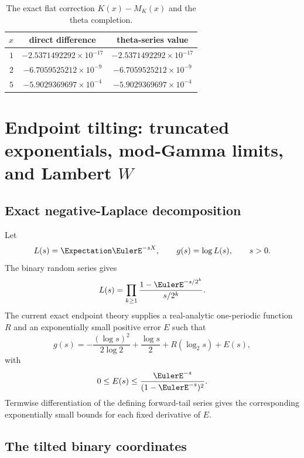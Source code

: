 \documentclass[11pt]{article}
\numberwithin{equation}{section}
\theoremstyle{definition}
\theoremstyle{remark}
\begin{document}
\begin{table}[ht]
\centering
\caption{The exact flat correction $K(x)-M_K(x)$ and the theta completion.}
\label{p5:tab:theta-check}
\begin{tabular}{@{}rcc@{}}
\toprule
$x$ & direct difference & theta-series value\\
\midrule
$1$ & $-2.5371492292\times10^{-17}$ & $-2.5371492292\times10^{-17}$\\
$2$ & $-6.7059525212\times10^{-9}$  & $-6.7059525212\times10^{-9}$\\
$5$ & $-5.9029369697\times10^{-4}$  & $-5.9029369697\times10^{-4}$\\
\bottomrule
\end{tabular}
\end{table}

\section{Endpoint tilting: truncated exponentials, mod-Gamma limits, and Lambert $W$}

\subsection{Exact negative-Laplace decomposition}

Let
\begin{equation}\label{p5:eq:L-g-def}
 L(s)=\Expectation\EulerE^{-sX},\qquad g(s)=\log L(s),\qquad s>0.
\end{equation}
The binary random series gives
\begin{equation}\label{p5:eq:L-product}
 L(s)=\prod_{k\ge1}\frac{1-\EulerE^{-s/2^k}}{s/2^k}.
\end{equation}
The current exact endpoint theory supplies a real-analytic one-periodic
function $R$ and an exponentially small positive error $E$ such that
\begin{equation}\label{p5:eq:g-decomp}
 \boxed{
 g(s)=-\frac{(\log s)^2}{2\log2}+\frac{\log s}{2}
 +R(\log_2s)+E(s),}
\end{equation}
with
\begin{equation}\label{p5:eq:E-bound}
 0\le E(s)\le\frac{\EulerE^{-s}}{(1-\EulerE^{-s})^2}.
\end{equation}
Termwise differentiation of the defining forward-tail series gives the
corresponding exponentially small bounds for each fixed derivative of $E$.

\subsection{The tilted binary coordinates}
\end{document}
